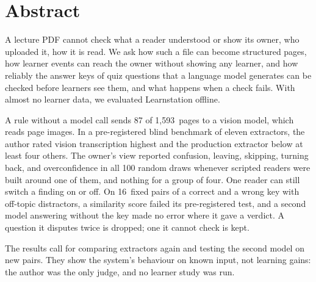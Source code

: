 \chapter*{Abstract}

A lecture PDF cannot check what a reader understood or show its owner, who
uploaded it, how it is read. We ask how such a file can become structured
pages, how learner events can reach the owner without showing any learner,
and how reliably the answer keys of quiz questions that a language model
generates can be checked before learners see them, and what happens when a
check fails. With almost no learner data, we evaluated Learnstation
offline.

A rule without a model call sends 87 of 1{,}593~pages to a vision model,
which reads page images. In a pre-registered blind benchmark of eleven
extractors, the author rated vision transcription highest and the production
extractor below at least four others. The owner's view reported confusion,
leaving, skipping, turning back, and overconfidence in all 100 random draws
whenever scripted readers were built around one of them, and
nothing for a group of four. One reader can still switch a finding on or off.
On 16~fixed pairs of a correct and a wrong key with off-topic distractors, a
similarity score failed its pre-registered test, and a second model answering
without the key made no error where it gave a verdict. A question it disputes
twice is dropped; one it cannot check is kept.

The results call for comparing extractors again and testing the second model
on new pairs. They show the system's behaviour on known input, not learning gains: the author
was the only judge, and no learner study was run.

\clearpage

